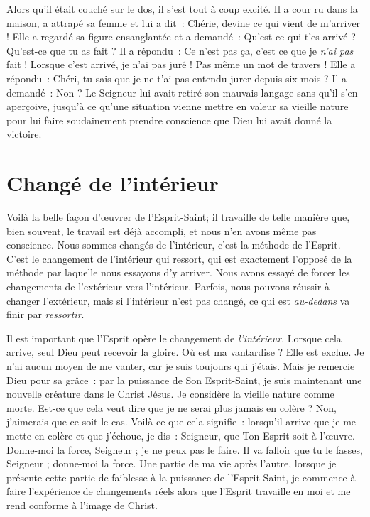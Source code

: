 Alors qu'il était couché sur le dos, il s'est tout à coup excité.
 Il a cour ru dans la maison, a attrapé sa femme et lui a dit~:
 \og Chérie, devine ce qui vient de m'arriver ! \fg{}
 Elle a regardé sa figure ensanglantée et a demandé~:
 \og Qu'est-ce qui t'es arrivé ? Qu'est-ce que tu as fait ? \fg{}
 Il a répondu~:
 \og Ce n'est pas ça, c'est ce que je \emph{n'ai pas} fait !
 Lorsque c'est arrivé, je n'ai pas juré ! Pas même un mot de travers ! \fg{}
 Elle a répondu~:
 \og Chéri, tu sais que je ne t'ai pas entendu jurer depuis six mois ? \fg{}
 Il a demandé~: \og Non ? \fg{}
 Le Seigneur lui avait retiré son mauvais langage sans qu'il s'en aperçoive,
 jusqu'à ce qu'une situation vienne mettre en valeur sa vieille nature
 pour lui faire soudainement prendre conscience
 que Dieu lui avait donné la victoire.


\section*{Changé de l'intérieur}

Voilà la belle façon d'œuvrer de l'Esprit-Saint;
 il travaille de telle manière que, bien souvent,
 le travail est déjà accompli, et nous n'en avons même pas conscience.
 Nous sommes changés de l'intérieur, c'est la méthode de l'Esprit.
 C'est le changement de l'intérieur qui ressort,
 qui est exactement l'opposé de la méthode par laquelle
 nous essayons d'y arriver.
 Nous avons essayé de forcer les changements de l'extérieur
 vers l'intérieur.
 Parfois, nous pouvons réussir à changer l'extérieur,
 mais si l'intérieur n'est pas changé,
 ce qui est \emph{au-dedans} va finir par \emph{ressortir}.

Il est important que l'Esprit opère le changement de \emph{l'intérieur}.
 Lorsque cela arrive, seul Dieu peut recevoir la gloire.
 Où est ma vantardise ? Elle est exclue.
 Je n'ai aucun moyen de me vanter, car je suis toujours qui j'étais.
 Mais je remercie Dieu pour sa grâce~: par la puissance de Son Esprit-Saint,
 je suis maintenant une nouvelle créature dans le Christ Jésus.
 Je considère la vieille nature comme morte.
 Est-ce que cela veut dire que je ne serai plus jamais en colère ?
 Non, j'aimerais que ce soit le cas.
 Voilà ce que cela signifie~: lorsqu'il arrive que je me mette en colère
 et que j'échoue, je dis~:
 \og Seigneur, que Ton Esprit soit à l'œuvre. Donne-moi la force,
 Seigneur ; je ne peux pas le faire. Il va falloir que tu le fasses,
 Seigneur ; donne-moi la force. \fg{}
 Une partie de ma vie après l'autre, lorsque je présente cette partie
 de faiblesse à la puissance de l'Esprit-Saint, je commence à faire
 l'expérience de changements réels alors que l'Esprit travaille en moi
 et me rend conforme à l'image de Christ.


